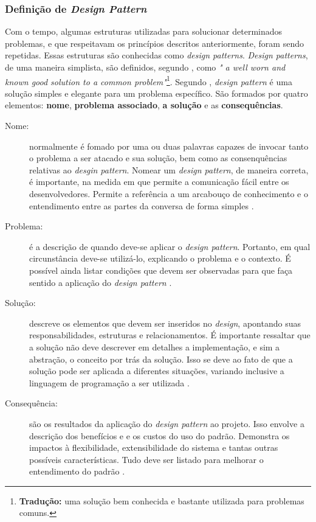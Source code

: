 \subsubsection{Definição de \textit{Design Pattern}} 
Com o tempo, algumas estruturas utilizadas para solucionar determinados problemas, e que respeitavam os princípios descritos anteriormente, foram sendo repetidas. Essas estruturas são conhecidas como  \textit{design patterns}. \textit{Design patterns}, de uma maneira simplista, são definidos, segundo , como \textit{" a well worn and known good solution to
a common problem"}\footnote{\textbf{Tradução:} uma solução bem conhecida e bastante utilizada para problemas comuns.}. Segundo , \textit{design pattern} é uma solução simples e elegante para um problema específico. São formados por quatro elementos: \textbf{nome}, \textbf{problema associado}, \textbf{a solução} e as \textbf{consequências}.
\begin{description}
\item[Nome:] normalmente é fomado por uma ou duas palavras capazes de invocar tanto o problema a ser atacado e sua solução, bem como as consenquências relativas ao \textit{desgin pattern}. Nomear um \textit{design pattern}, de maneira correta, é importante, na medida em que permite a comunicação fácil entre os desenvolvedores. Permite a referência a um arcabouço de conhecimento e o entendimento entre as partes da conversa de forma simples \cite{martin2000}.
\item[Problema:] é a descrição de quando deve-se aplicar o \textit{design pattern}. Portanto, em qual circunstância deve-se utilizá-lo, explicando o problema e o contexto. É possível ainda listar condições que devem ser observadas para que faça sentido a aplicação do \textit{design pattern} \cite{martin2000}.
\item[Solução:] descreve os elementos que devem ser inseridos no \textit{design}, apontando suas responsabilidades, estruturas e relacionamentos. É importante ressaltar que a solução não deve descrever em detalhes a implementação, e sim a abstração, o conceito por trás da solução. Isso se deve ao fato de que a solução pode ser aplicada a diferentes situações, variando inclusive a linguagem de programação a ser utilizada \cite{martin2000}.
\item[Consequência:] são os resultados da aplicação do \textit{design pattern} ao projeto. Isso envolve a descrição dos benefícios e e os custos do uso do padrão. Demonstra os impactos à flexibilidade, extensibilidade do sistema e tantas outras possíveis características. Tudo deve ser listado para melhorar o entendimento do padrão \cite{martin2000}.
\end{description}
\par
